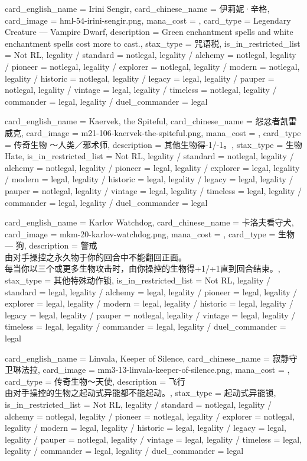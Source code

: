\documentclass[lang = cn, color = black, 10pt]{AllThatStax}
\begin{document}
\card
{
	card_english_name = {Irini Sengir},
	card_chinese_name = {伊莉妮·辛格},
	card_image = hml-54-irini-sengir.png,
	mana_cost = ,
	card_type = Legendary Creature — Vampire Dwarf,
	description = {Green enchantment spells and white enchantment spells cost  more to cast.},
	stax_type = 咒语税,
	is_in_restricted_list = Not RL,
	legality / standard = notlegal,
	legality / alchemy = notlegal,
	legality / pioneer = notlegal,
	legality / explorer = notlegal,
	legality / modern = notlegal,
	legality / historic = notlegal,
	legality / legacy = legal,
	legality / pauper = notlegal,
	legality / vintage = legal,
	legality / timeless = notlegal,
	legality / commander = legal,
	legality / duel_commander = legal
}

\card
{
	card_english_name = {Kaervek, the Spiteful},
	card_chinese_name = {怨忿者凯雷威克},
	card_image = m21-106-kaervek-the-spiteful.png,
	mana_cost = ,
	card_type = 传奇生物 ～人类／邪术师,
	description = {其他生物得-1/-1。},
	stax_type = 生物Hate,
	is_in_restricted_list = Not RL,
	legality / standard = notlegal,
	legality / alchemy = notlegal,
	legality / pioneer = legal,
	legality / explorer = legal,
	legality / modern = legal,
	legality / historic = legal,
	legality / legacy = legal,
	legality / pauper = notlegal,
	legality / vintage = legal,
	legality / timeless = legal,
	legality / commander = legal,
	legality / duel_commander = legal
}

\card
{
	card_english_name = {Karlov Watchdog},
	card_chinese_name = {卡洛夫看守犬},
	card_image = mkm-20-karlov-watchdog.png,
	mana_cost = ,
	card_type = 生物 — 狗,
	description = {警戒\\
		由对手操控之永久物于你的回合中不能翻回正面。\\
		每当你以三个或更多生物攻击时，由你操控的生物得+1/+1直到回合结束。},
	stax_type = 其他特殊动作锁,
	is_in_restricted_list = Not RL,
	legality / standard = legal,
	legality / alchemy = legal,
	legality / pioneer = legal,
	legality / explorer = legal,
	legality / modern = legal,
	legality / historic = legal,
	legality / legacy = legal,
	legality / pauper = notlegal,
	legality / vintage = legal,
	legality / timeless = legal,
	legality / commander = legal,
	legality / duel_commander = legal
}

\card
{
	card_english_name = {Linvala, Keeper of Silence},
	card_chinese_name = {寂静守卫琳法拉},
	card_image = mm3-13-linvala-keeper-of-silence.png,
	mana_cost = ,
	card_type = 传奇生物～天使,
	description = {飞行\\
		由对手操控的生物之起动式异能都不能起动。},
	stax_type = 起动式异能锁,
	is_in_restricted_list = Not RL,
	legality / standard = notlegal,
	legality / alchemy = notlegal,
	legality / pioneer = notlegal,
	legality / explorer = notlegal,
	legality / modern = legal,
	legality / historic = legal,
	legality / legacy = legal,
	legality / pauper = notlegal,
	legality / vintage = legal,
	legality / timeless = legal,
	legality / commander = legal,
	legality / duel_commander = legal
}
\end{document}
